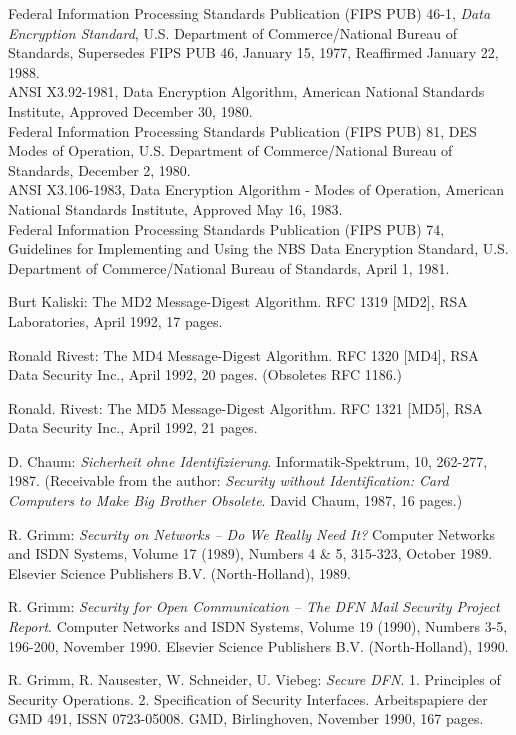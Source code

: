 \begin{thebibliography}{99}
Federal Information  Processing Standards Publication  (FIPS
PUB)   46-1, {\em Data  Encryption Standard},  U.S. Department  of
Commerce/National Bureau  of Standards, Supersedes  FIPS PUB
46,  January 15, 1977, Reaffirmed January 22, 1988. \\ [1ex]
ANSI   X3.92-1981,  Data   Encryption  Algorithm,   American
National  Standards Institute, Approved December 30, 1980. \\ [1ex]
Federal Information  Processing Standards  Publication (FIPS
PUB)    81,  DES  Modes  of Operation,  U.S.  Department  of
Commerce/National Bureau of Standards, December 2, 1980. \\ [1ex]
ANSI  X3.106-1983,  Data  Encryption  Algorithm -  Modes  of
Operation, American  National Standards  Institute, Approved
May  16, 1983. \\ [1ex]
Federal Information  Processing Standards  Publication (FIPS
PUB)  74, Guidelines for Implementing and Using the NBS Data
Encryption  Standard, U.S.  Department of  Commerce/National
Bureau of Standards, April 1, 1981.

Burt Kaliski:
The MD2 Message-Digest Algorithm.
RFC 1319 [MD2], RSA Laboratories, April 1992, 17 pages.

Ronald Rivest:
The MD4 Message-Digest Algorithm.
RFC 1320 [MD4], RSA Data Security Inc., April 1992, 20 pages.
(Obsoletes RFC 1186.)

Ronald. Rivest:
The MD5 Message-Digest Algorithm.
RFC 1321 [MD5], RSA Data Security Inc., April 1992, 21 pages.

D. Chaum:
{\em Sicherheit ohne Identifizierung}.
Informatik-Spektrum, 10, 262-277, 1987.
(Receivable from the author:
{\em Security without Identification:
Card Computers to Make Big Brother Obsolete}.
David Chaum, 1987, 16 pages.)

R. Grimm:
{\em Security on Networks -- Do We Really Need It?}
Computer Networks and ISDN Systems,
Volume 17 (1989), Numbers 4 \& 5, 315-323, October 1989.
Elsevier Science Publishers B.V. (North-Holland), 1989.

R. Grimm:
{\em Security for Open Communication --
The DFN Mail Security Project Report}.
Computer Networks and ISDN Systems,
Volume 19 (1990), Numbers 3-5, 196-200, November 1990.
Elsevier Science Publishers B.V. (North-Holland), 1990.

R. Grimm, R. Nausester, W. Schneider, U. Viebeg:
{\em Secure DFN}.
1. Principles of Security Operations.
2. Specification of Security Interfaces.
Arbeitspapiere der GMD 491, ISSN 0723-05008.
GMD, Birlinghoven, November 1990, 167 pages.


\end{thebibliography}

